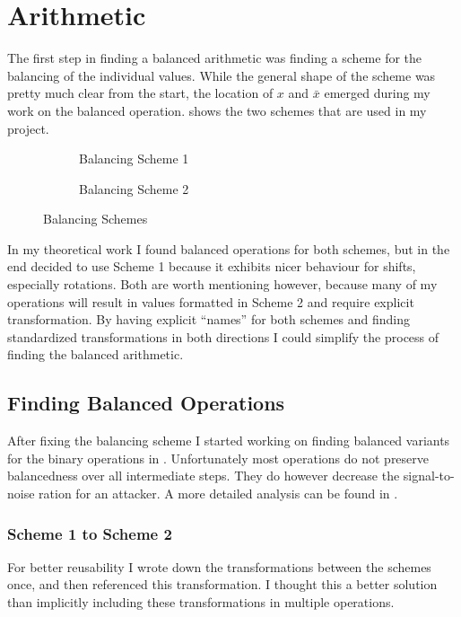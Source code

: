 \section{Arithmetic}
The first step in finding a balanced arithmetic was finding a scheme for the balancing of the individual values.
While the general shape of the scheme was pretty much clear from the start, the location of $x$ and $\bar{x}$ emerged during my work on the balanced operation.
 shows the two schemes that are used in my project.

\begin{figure}[h]
  \centering
  \begin{subfigure}{.49\linewidth}
    \centering
    \caption{Balancing Scheme 1}
    \label{fig:scheme1}
  \end{subfigure}
  \begin{subfigure}{0.49\linewidth}
    \centering
    \caption{Balancing Scheme 2}
  \end{subfigure}
  \caption{Balancing Schemes}
  \label{fig:schemes}
\end{figure}

In my theoretical work I found balanced operations for both schemes, but in the end decided to use Scheme 1 because it exhibits nicer behaviour for shifts, especially rotations.
Both are worth mentioning however, because many of my operations will result in values formatted in Scheme 2 and require explicit transformation.
By having explicit ``names'' for both schemes and finding standardized transformations in both directions I could simplify the process of finding the balanced arithmetic.

\subsection{Finding Balanced Operations}
\label{operations}
After fixing the balancing scheme I started working on finding balanced variants for the binary operations in \ir{}.
Unfortunately most operations do not preserve balancedness over all intermediate steps.
They do however decrease the signal-to-noise ration for an attacker.
A more detailed analysis can be found in .

\subsubsection{Scheme 1 to Scheme 2}
For better reusability I wrote down the transformations between the schemes once, and then referenced this transformation.
I thought this a better solution than implicitly including these transformations in multiple operations.

